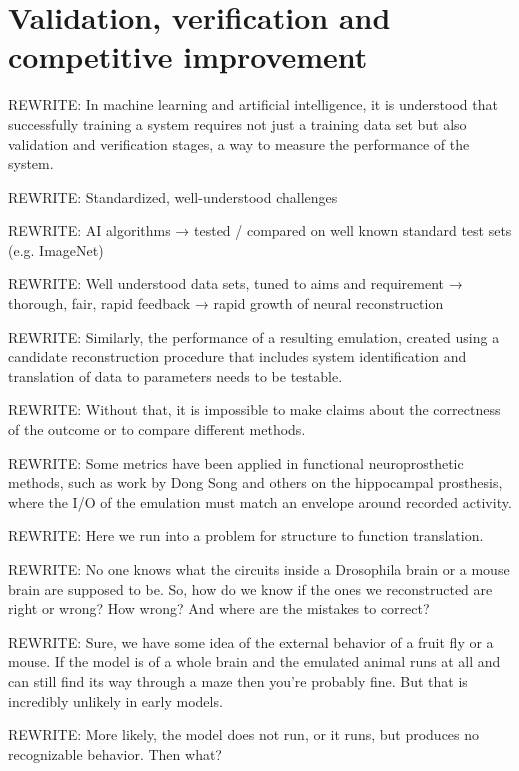 \documentclass{ldr-article}
\begin{document}
\section{Validation, verification and competitive improvement}

\alert{REWRITE:} In machine learning and artificial intelligence, it is understood that successfully training a system requires not just a training data set but also validation and verification stages, a way to measure the performance of the system.

\alert{REWRITE:} Standardized, well-understood challenges

\alert{REWRITE:} AI algorithms → tested / compared on well known standard test sets (e.g. ImageNet)

\alert{REWRITE:} Well understood data sets, tuned to aims and requirement → thorough, fair, rapid feedback → rapid growth of neural reconstruction



\alert{REWRITE:} Similarly, the performance of a resulting emulation, created using a candidate reconstruction procedure that includes system identification and translation of data to parameters needs to be testable.

\alert{REWRITE:} Without that, it is impossible to make claims about the correctness of the outcome or to compare different methods.

\alert{REWRITE:} Some metrics have been applied in functional neuroprosthetic methods, such as work by Dong Song and others on the hippocampal prosthesis, where the I/O of the emulation must match an envelope around recorded activity.

\alert{REWRITE:} Here we run into a problem for structure to function translation.

\alert{REWRITE:} No one knows what the circuits inside a Drosophila brain or a mouse brain are supposed to be. So, how do we know if the ones we reconstructed are right or wrong? How wrong? And where are the mistakes to correct?

\alert{REWRITE:} Sure, we have some idea of the external behavior of a fruit fly or a mouse. If the model is of a whole brain and the emulated animal runs at all and can still find its way through a maze then you’re probably fine. But that is incredibly unlikely in early models.

\alert{REWRITE:} More likely, the model does not run, or it runs, but produces no recognizable behavior. Then what?
\end{document}
